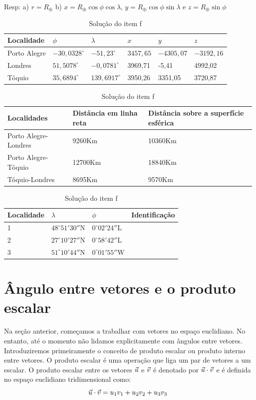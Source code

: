 \begin{table}[h]
Resp: a) $r=R_\oplus$ b)
 $x=R_\oplus \cos\phi \cos\lambda$, $y=R_\oplus \cos\phi\sin\lambda$ e $z=R_\oplus \sin\phi$
	\centering
		\begin{tabular}{|l|l|l|l|l|l|}
		\hline
	  Localidade & $\phi$ & $\lambda$ & $x$ & $y$ & $z$\\ 
		\hline
		Porto Alegre & $-30,0328^\circ$ & $-51,23^\circ$& $3457,65$&$-4305,07$& $-3192,16$\\ 		
  	\hline
		Londres & $51,5078^\circ$ & $-0,0781^\circ$&3969,71&-5,41&4992,02\\ 		
  	\hline
  	Tóquio & $35,6894^\circ$ & $139,6917^\circ$&3950,26&3351,05&3720,87\\ 		
  	\hline	
		\end{tabular}
	\caption{Coordenadas geográficas  e cartesianas de algumas cidades - solução do item d.}
\vspace{10pt}
		\begin{tabular}{|l|l|l|}
		\hline
	  Localidades & Distância em linha reta & Distância sobre a superfície esférica \\ 
		\hline
		Porto Alegre-Londres & 9260Km & 10360Km\\ 		
  	\hline
  	Porto Alegre-Tóquio & 12700Km&18840Km\\ 		
  	\hline
		Tóquio-Londres &8695Km &9570Km\\ 		
  	\hline		
		\end{tabular}
	\caption{Distância entre as cidades - solução do item e.}

\vspace{10pt}	
		\begin{tabular}{|l|l|l|l|}
		\hline
Localidade &	  $\lambda$ & $\phi$& Identificação\\ 
		\hline
1&		$48^\circ 51{'}30{''}$N &	$0^\circ 02{'}24{''}$L & \\
	\hline
2&	  $27^\circ 10{'}27{''}$N & 	$0^\circ 58{'}42{''}$L & \\
	\hline
3&	  $51^\circ 10{'}44{''}$N & $0^\circ 01{'}55{''}$W&  \\
		\hline		
		\end{tabular}
	\caption{Solução do item f}
\end{table}



\section{Ângulo entre vetores e o produto escalar}
Na seção anterior, começamos a trabalhar com vetores no espaço euclidiano. No entanto, até o momento não lidamos explicitamente com ângulos entre vetores. Introduziremos primeiramente o conceito de produto escalar ou produto interno entre vetores. O produto escalar é uma operação que liga um par de vetores a um escalar. O produto escalar entre os vetores $\vec{u}$ e $\vec{v}$  é denotado por $\vec{u}\cdot \vec{v}$ e é definida no espaço euclidiano tridimensional como:
\begin{equation}\label{defprodesc}\vec{u}\cdot\vec{v}=u_1v_1+u_2v_2+u_3v_3\end{equation}




